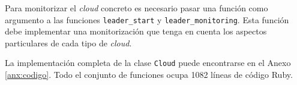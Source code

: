 Para monitorizar el \emph{cloud} concreto es necesario pasar una función como argumento a las funciones \texttt{leader\_start} y \texttt{leader\_monitoring}. Esta función debe implementar una monitorización que tenga en cuenta los aspectos particulares de cada tipo de \emph{cloud}.

La implementación completa de la clase \texttt{Cloud} puede encontrarse en el Anexo \ref{anx:codigo}. Todo el conjunto de funciones ocupa 1082 líneas de código Ruby.
